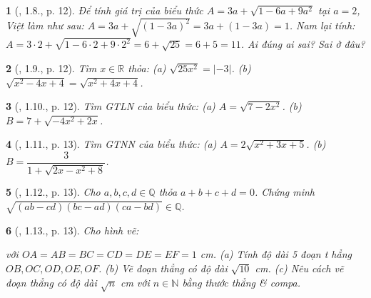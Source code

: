 \documentclass{article}
\newtheorem{baitoan}{}
\begin{document}
\begin{baitoan}[\cite{Binh_boi_duong_Toan_9_tap_1}, 1.8., p. 12]
	Để tính giá trị của biểu thức $A = 3a + \sqrt{1 - 6a + 9a^2}$ tại $a = 2$, Việt làm như sau: $A = 3a + \sqrt{(1 - 3a)^2} = 3a + (1 - 3a) = 1$. Nam lại tính: $A = 3\cdot2 + \sqrt{1 - 6\cdot2 + 9\cdot2^2} = 6 + \sqrt{25} = 6 + 5 = 11$. Ai đúng ai sai? Sai ở đâu?
\end{baitoan}

\begin{baitoan}[\cite{Binh_boi_duong_Toan_9_tap_1}, 1.9., p. 12]
	Tìm $x\in\mathbb{R}$ thỏa: (a) $\sqrt{25x^2} = |-3|$. (b) $\sqrt{x^2 - 4x + 4} = \sqrt{x^2 + 4x + 4}$.
\end{baitoan}

\begin{baitoan}[\cite{Binh_boi_duong_Toan_9_tap_1}, 1.10., p. 12]
	Tìm {\rm GTLN} của biểu thức: (a) $A = \sqrt{7 - 2x^2}$. (b) $B = 7 + \sqrt{-4x^2 + 2x}$.
\end{baitoan}

\begin{baitoan}[\cite{Binh_boi_duong_Toan_9_tap_1}, 1.11., p. 13]
	Tìm {\rm {\rm GTNN}} của biểu thức: (a) $A = 2\sqrt{x^2 + 3x + 5}$. (b) $B = \dfrac{3}{1 + \sqrt{2x - x^2 + 8}}$.
\end{baitoan}

\begin{baitoan}[\cite{Binh_boi_duong_Toan_9_tap_1}, 1.12., p. 13]
	Cho $a,b,c,d\in\mathbb{Q}$ thỏa $a + b + c + d = 0$. Chứng minh $\sqrt{(ab - cd)(bc - ad)(ca - bd)}\in\mathbb{Q}$.
\end{baitoan}

\begin{baitoan}[\cite{Binh_boi_duong_Toan_9_tap_1}, 1.13., p. 13]
	Cho hình vẽ:
	\begin{center}
	\end{center}
	với $OA = AB = BC = CD = DE = EF = 1$ {\rm cm}. (a) Tính độ dài 5 đoạn t hẳng $OB,OC,OD,OE,OF$. (b) Vẽ đoạn thẳng có độ dài $\sqrt{10}$ {\rm cm}. (c) Nêu cách vẽ đoạn thẳng có độ dài $\sqrt{n}$ {\rm cm} với $n\in\mathbb{N}$ bằng thước thẳng \& compa.
\end{baitoan}
\end{document}

